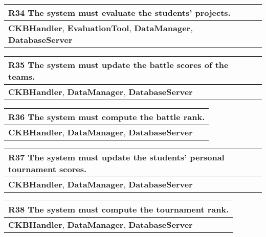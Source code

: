 \begin{table}[H]
    \begin{tabularx}{\textwidth}{X}
        \toprule
        \textbf{R34} The system must evaluate the students' projects. \\ \midrule
        \textbf{CKBHandler}, \textbf{EvaluationTool}, \textbf{DataManager}, \textbf{DatabaseServer}                      \\
    \end{tabularx}
\end{table}

\begin{table}[H]
    \begin{tabularx}{\textwidth}{X}
        \toprule
        \textbf{R35} The system must update the battle scores of the teams. \\ \midrule
        \textbf{CKBHandler}, \textbf{DataManager}, \textbf{DatabaseServer}                     \\
    \end{tabularx}
\end{table}

\begin{table}[H]
    \begin{tabularx}{\textwidth}{X}
        \toprule
        \textbf{R36} The system must compute the battle rank. \\ \midrule
        \textbf{CKBHandler}, \textbf{DataManager}, \textbf{DatabaseServer}                     \\
    \end{tabularx}
\end{table}

\begin{table}[H]
    \begin{tabularx}{\textwidth}{X}
        \toprule
        \textbf{R37} The system must update the students' personal tournament scores.  \\ \midrule
        \textbf{CKBHandler}, \textbf{DataManager}, \textbf{DatabaseServer}                     \\
    \end{tabularx}
\end{table}

\begin{table}[H]
    \begin{tabularx}{\textwidth}{X}
        \toprule
        \textbf{R38} The system must compute the tournament rank. \\ \midrule
        \textbf{CKBHandler}, \textbf{DataManager}, \textbf{DatabaseServer}                  \\
    \end{tabularx}
\end{table}

